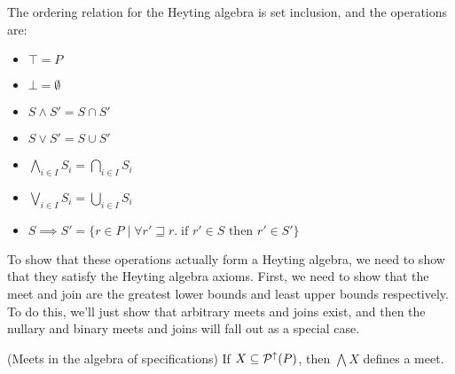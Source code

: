 The ordering relation for the Heyting algebra is set inclusion, and
the operations are:

\begin{itemize}
\item $\top = P$
\item $\bot = \emptyset$
\item $S \land S' = S \cap S'$
\item $S \vee S' = S \cup S'$
\item $\bigwedge_{i \in I} S_i = \bigcap_{i \in I} S_i$
\item $\bigvee_{i \in I} S_i = \bigcup_{i \in I} S_i$
\item $S \implies S' = \{ r \in P \;|\; \forall r' \sqsupseteq r.\; 	
                          \mbox{if } r' \in S \mbox{ then } r' \in S' \}$
\end{itemize}

To show that these operations actually form a Heyting algebra, we need
to show that they satisfy the Heyting algebra axioms. First, we need
to show that the meet and join are the greatest lower bounds and least
upper bounds respectively. To do this, we'll just show that arbitrary
meets and joins exist, and then the nullary and binary meets and joins
will fall out as a special case.

\begin{lemma}{(Meets in the algebra of specifications)}
If $X \subseteq \mathcal{P}^{\uparrow}({P})$, then $\bigwedge X$ defines a meet. 
\end{lemma}

